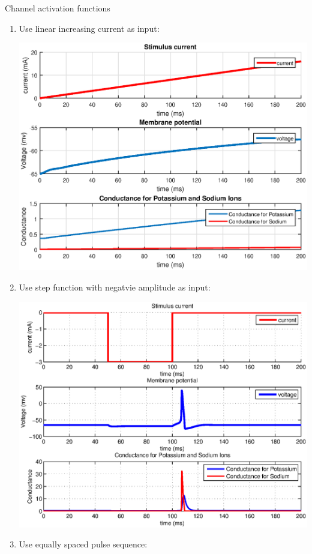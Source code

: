 \documentclass[12pt]{article}
\newenvironment{exercise}[2][Exercise]{\begin{trivlist}
\item[\hskip \labelsep {\bfseries #1}\hskip \labelsep {\bfseries #2.}]}{\end{trivlist}}
\begin{document}
\begin{exercise}{2.2}
Channel activation functions \\
\renewcommand{\labelenumi}{\alph{enumi})}
\begin{enumerate}
\item Use linear increasing current as input:

  \includegraphics[width=5in]{rheobase.eps}

\item Use step function with negatvie amplitude as input:

  \includegraphics[width=5in]{inhrebound.eps}

\item Use equally spaced pulse sequence:


\end{enumerate}
\end{exercise}
\end{document}
